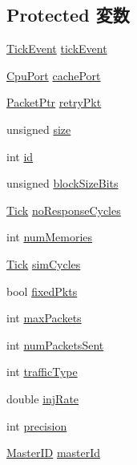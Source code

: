 \subsection*{Protected 変数}
\begin{DoxyCompactItemize}
\item 
\hyperlink{classNetworkTest_1_1TickEvent}{TickEvent} \hyperlink{classNetworkTest_aa36b8e894416f0ec98f701ab08f2ac22}{tickEvent}
\item 
\hyperlink{classNetworkTest_1_1CpuPort}{CpuPort} \hyperlink{classNetworkTest_a9529cc9b43e49c677df49655a2dcae59}{cachePort}
\item 
\hyperlink{classPacket}{PacketPtr} \hyperlink{classNetworkTest_a314ae93c04b3ca96e79e1b1f39a8e478}{retryPkt}
\item 
unsigned \hyperlink{classNetworkTest_a245260f6f74972558f61b85227df5aae}{size}
\item 
int \hyperlink{classNetworkTest_a7441ef0865bcb3db9b8064dd7375c1ea}{id}
\item 
unsigned \hyperlink{classNetworkTest_ad806dea9a8763c5e460c2fb0e0273079}{blockSizeBits}
\item 
\hyperlink{base_2types_8hh_a5c8ed81b7d238c9083e1037ba6d61643}{Tick} \hyperlink{classNetworkTest_abd244ba570b7767d45bbc8400f11cb63}{noResponseCycles}
\item 
int \hyperlink{classNetworkTest_a9bb2da4410d9b82f3127f1bc19a61387}{numMemories}
\item 
\hyperlink{base_2types_8hh_a5c8ed81b7d238c9083e1037ba6d61643}{Tick} \hyperlink{classNetworkTest_a998e12661fc73aead3bbef59ee7f906e}{simCycles}
\item 
bool \hyperlink{classNetworkTest_abb14fc2bf42917ab4c183178e8d4bab5}{fixedPkts}
\item 
int \hyperlink{classNetworkTest_a9a344c57917454f3d9f01b7e215d8286}{maxPackets}
\item 
int \hyperlink{classNetworkTest_adb611783bb21b4e82660dca33172a0a8}{numPacketsSent}
\item 
int \hyperlink{classNetworkTest_a4230ca40857c8ef75f071969601cdaa8}{trafficType}
\item 
double \hyperlink{classNetworkTest_ab3eaf536c2a8f4d5ca565a0f5ebaf6dc}{injRate}
\item 
int \hyperlink{classNetworkTest_aa95455ed52a8459fad69509a4a0411b5}{precision}
\item 
\hyperlink{request_8hh_ac366b729262fd8e7cbd3283da6f775cf}{MasterID} \hyperlink{classNetworkTest_a96ec6a422ac492d05f8b3edc5b58532b}{masterId}
\end{DoxyCompactItemize}
